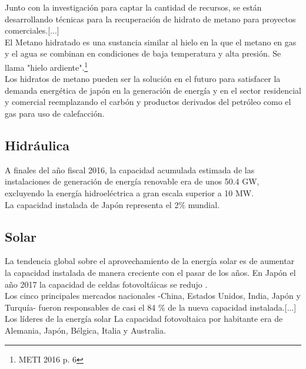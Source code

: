 \documentclass[]{article}
\begin{document}
Junto con la investigación para captar la cantidad de recursos, se están desarrollando técnicas para la recuperación de hidrato de metano para proyectos comerciales.[...]\\

El Metano hidratado es una sustancia similar al hielo en la que el metano en gas y el agua se combinan en condiciones de baja temperatura y alta presión. Se llama "hielo ardiente".\citep{METI2016}\footnote{METI 2016 p. 6}\\

Los hidratos de metano pueden ser la solución en el futuro para satisfacer la demanda energética de japón en la generación de energía y en el sector residencial y comercial reemplazando el carbón y productos derivados del petróleo como el gas para uso de calefacción.\\

\subsection{Hidráulica}

A finales del año fiscal 2016, la capacidad acumulada estimada de las instalaciones de generación de energía renovable era de unos 50.4 GW, excluyendo la energía hidroeléctrica a gran escala superior a 10 MW.\cite{Matsubara2018}\\

La capacidad instalada de Japón representa el 2$\%$ mundial.\citep{Renewables2017globalstatusreport2017}\\


\subsection{Solar}

La tendencia global sobre el aprovechamiento de la energía solar es de aumentar la capacidad instalada de manera creciente con el pasar de los años. En Japón el año 2017 la capacidad de celdas fotovoltáicas se redujo .\\

Los cinco principales mercados nacionales -China, Estados Unidos, India, Japón y Turquía- fueron responsables de casi el 84  $\%$ de la nueva capacidad instalada.[...] Los líderes de la energía solar
La capacidad fotovoltaica por habitante era de Alemania, Japón, Bélgica, Italia y Australia.
\end{document}
